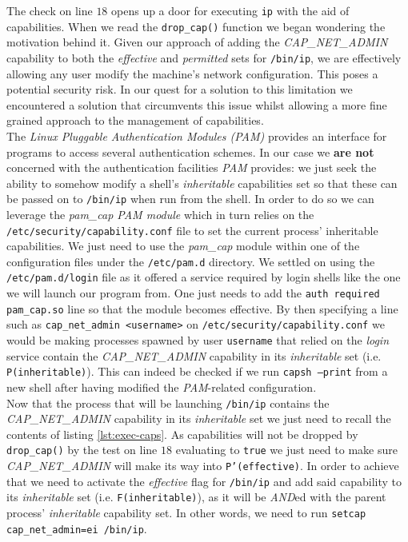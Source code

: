         

        The check on line $18$ opens up a door for executing \texttt{ip} with the aid of capabilities. When we read the \texttt{drop\_cap()} function we began wondering the motivation behind it. Given our approach of adding the \textit{CAP\_NET\_ADMIN} capability to both the \textit{effective} and \textit{permitted} sets for \texttt{/bin/ip}, we are effectively allowing any user modify the machine's network configuration. This poses a potential security risk. In our quest for a solution to this limitation we encountered a solution that circumvents this issue whilst allowing a more fine grained approach to the management of capabilities.\\

        The \textit{Linux Pluggable Authentication Modules (PAM)} \cite{bib:man-pam} provides an interface for programs to access several authentication schemes. In our case we \textbf{are not} concerned with the authentication facilities \textit{PAM} provides: we just seek the ability to somehow modify a shell's \textit{inheritable} capabilities set so that these can be passed on to \texttt{/bin/ip} when run from the shell. In order to do so we can leverage the \textit{pam\_cap PAM module} \cite{bib:man-pam-cap} which in turn relies on the \texttt{/etc/security/capability.conf} file to set the current process' inheritable capabilities. We just need to use the \textit{pam\_cap} module within one of the configuration files under the \texttt{/etc/pam.d} directory. We settled on using the \texttt{/etc/pam.d/login} file as it offered a service required by login shells like the one we will launch our program from. One just needs to add the \texttt{auth required pam\_cap.so} line so that the module becomes effective. By then specifying a line such as \texttt{cap\_net\_admin  <username>} on \texttt{/etc/security/capability.conf} we would be making processes spawned by user \texttt{username} that relied on the \textit{login} service contain the \textit{CAP\_NET\_ADMIN} capability in its \textit{inheritable} set (i.e. \texttt{P(inheritable)}). This can indeed be checked if we run \texttt{capsh --print} from a new shell after having modified the \textit{PAM}-related configuration.\\

        Now that the process that will be launching \texttt{/bin/ip} contains the \textit{CAP\_NET\_ADMIN} capability in its \textit{inheritable} set we just need to recall the contents of listing \ref{lst:exec-caps}. As capabilities will not be dropped by \texttt{drop\_cap()} by the test on line $18$ evaluating to \texttt{true} we just need to make sure \textit{CAP\_NET\_ADMIN} will make its way into \texttt{P'(effective)}. In order to achieve that we need to activate the \textit{effective} flag for \texttt{/bin/ip} and add said capability to its \textit{inheritable} set (i.e. \texttt{F(inheritable)}), as it will be \textit{AND}ed with the parent process' \textit{inheritable} capability set. In other words, we need to run \texttt{setcap cap\_net\_admin=ei /bin/ip}.\\


